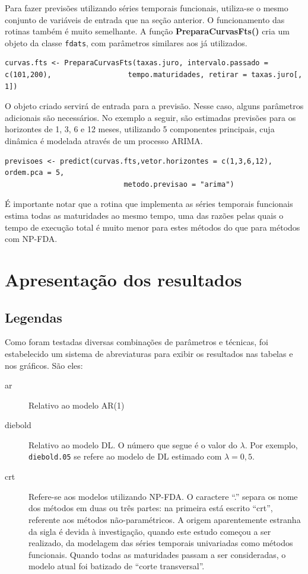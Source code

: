 \documentclass[
	12pt,				%
	openright,			%
	oneside,			%
	a4paper,			%
	english,			%
	brazil				%
	]{dissertacao-ufrgs-abntex2}
\begin{document}
\begin{apendicesenv}
Para fazer previsões utilizando séries temporais funcionais, utiliza-se o mesmo conjunto de variáveis de entrada que na seção anterior. O funcionamento das rotinas também é muito semelhante. A função \textbf{PreparaCurvasFts()} cria um objeto da classe \texttt{fdats}, com parâmetros similares aos já utilizados.
\begin{lstlisting} 
curvas.fts <- PreparaCurvasFts(taxas.juro, intervalo.passado = c(101,200), 					tempo.maturidades, retirar = taxas.juro[, 1])
\end{lstlisting} 
O objeto criado servirá de entrada para a previsão. Nesse caso, alguns parâmetros adicionais são necessários. No exemplo a seguir, são estimadas previsões para os horizontes de 1, 3, 6 e 12 meses, utilizando 5 componentes principais, cuja dinâmica é modelada através de um processo ARIMA. 
\begin{lstlisting} 
previsoes <- predict(curvas.fts,vetor.horizontes = c(1,3,6,12), ordem.pca = 5, 
							metodo.previsao = "arima")
\end{lstlisting}
É importante notar que a rotina que implementa as séries temporais funcionais estima todas as maturidades ao mesmo tempo, uma das razões pelas quais o tempo de execução total é muito menor para estes métodos do que para métodos com NP-FDA.



\chapter{Apresentação dos resultados} \label{tabelas-resultados}


\section{Legendas} \label{apend:legendas}

Como foram testadas diversas combinações de parâmetros e técnicas, foi estabelecido um sistema de abreviaturas para exibir os resultados nas tabelas e nos gráficos. São eles:

\begin{description}
	\item[ar] Relativo ao modelo AR(1)
	\item[diebold] Relativo ao modelo DL. O número que segue é o valor do $\lambda$. Por exemplo, \texttt{diebold.05} se refere ao modelo de DL estimado com $\lambda = 0,5$.
	\item[crt] Refere-se aos modelos utilizando NP-FDA. O caractere ``.'' separa os nome dos métodos em duas ou três partes: na primeira está escrito ``crt'', referente aos métodos não-paramétricos. A origem aparentemente estranha da sigla é devida à investigação, quando este estudo começou a ser realizado, da modelagem das séries temporais univariadas como métodos funcionais. Quando todas as maturidades passam a ser consideradas, o modelo atual foi batizado de ``corte transversal''. 
	

\end{description}
\end{apendicesenv}
\end{document}
